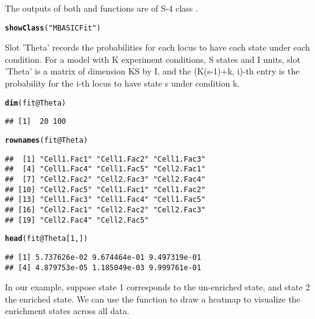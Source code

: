 \documentclass[a4paper,10pt]{article}\usepackage[]{graphicx}\usepackage[]{color}
\makeatletter
\newcommand{\hlnum}[1]{\textcolor[rgb]{0.686,0.059,0.569}{#1}}%
\newcommand{\hlstr}[1]{\textcolor[rgb]{0.192,0.494,0.8}{#1}}%
\newcommand{\hlopt}[1]{\textcolor[rgb]{0,0,0}{#1}}%
\newcommand{\hlstd}[1]{\textcolor[rgb]{0.345,0.345,0.345}{#1}}%
\newcommand{\hlkwc}[1]{\textcolor[rgb]{0.333,0.667,0.333}{#1}}%
\newcommand{\hlkwd}[1]{\textcolor[rgb]{0.737,0.353,0.396}{\textbf{#1}}}%
\newenvironment{kframe}{%
 \def\at@end@of@kframe{}%
 \ifinner\ifhmode%
  \def\at@end@of@kframe{\end{minipage}}%
  \begin{minipage}{\columnwidth}%
 \fi\fi%
 \def\FrameCommand##1{\hskip\@totalleftmargin \hskip-\fboxsep
 \colorbox{shadecolor}{##1}\hskip-\fboxsep
     \hskip-\linewidth \hskip-\@totalleftmargin \hskip\columnwidth}%
 \MakeFramed {\advance\hsize-\width
   \@totalleftmargin\z@ \linewidth\hsize
   \@setminipage}}%
 {\par\unskip\endMakeFramed%
 \at@end@of@kframe}
\newenvironment{knitrout}{}{} %
\makeatother
\begin{document}
The outputs of both  and  functions are of S-4 class .

\begin{knitrout}
\color{fgcolor}\begin{kframe}
\begin{alltt}
\hlkwd{showClass}\hlstd{(}\hlstr{"MBASICFit"}\hlstd{)}
\end{alltt}
\end{kframe}
\end{knitrout}

Slot 'Theta' records the probabilities for each locus to have each state under each condition. For a model with K experiment conditions, S states and I units, slot 'Theta' is a matrix of dimension KS by I, and the (K(s-1)+k, i)-th entry is the probability for the i-th locus to have state s under condition k. 

\begin{knitrout}
\color{fgcolor}\begin{kframe}
\begin{alltt}
\hlkwd{dim}\hlstd{(fit}\hlopt{@}\hlkwc{Theta}\hlstd{)}
\end{alltt}
\begin{verbatim}
## [1]  20 100
\end{verbatim}
\begin{alltt}
\hlkwd{rownames}\hlstd{(fit}\hlopt{@}\hlkwc{Theta}\hlstd{)}
\end{alltt}
\begin{verbatim}
##  [1] "Cell1.Fac1" "Cell1.Fac2" "Cell1.Fac3"
##  [4] "Cell1.Fac4" "Cell1.Fac5" "Cell2.Fac1"
##  [7] "Cell2.Fac2" "Cell2.Fac3" "Cell2.Fac4"
## [10] "Cell2.Fac5" "Cell1.Fac1" "Cell1.Fac2"
## [13] "Cell1.Fac3" "Cell1.Fac4" "Cell1.Fac5"
## [16] "Cell2.Fac1" "Cell2.Fac2" "Cell2.Fac3"
## [19] "Cell2.Fac4" "Cell2.Fac5"
\end{verbatim}
\begin{alltt}
\hlkwd{head}\hlstd{(fit}\hlopt{@}\hlkwc{Theta}\hlstd{[}\hlnum{1}\hlstd{, ])}
\end{alltt}
\begin{verbatim}
## [1] 5.737626e-02 9.674464e-01 9.497319e-01
## [4] 4.879753e-05 1.185049e-03 9.999761e-01
\end{verbatim}
\end{kframe}
\end{knitrout}

In our example, suppose state 1 corresponds to the un-enriched state, and state 2 the enriched state. We can use the function  to draw a heatmap to visualize the enrichment states across all data.
\end{document}
